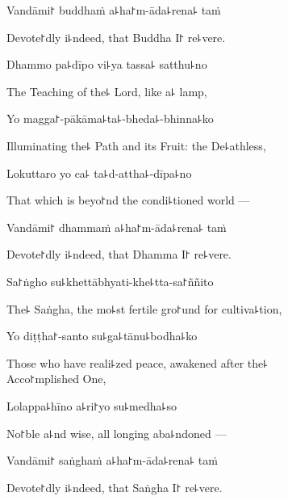 Vandāmi꜓ buddhaṁ a꜕ha꜓m-āda꜕rena꜕ taṁ

\begin{english}
  Devote꜓dly i꜕ndeed, that Buddha I꜓ re꜕vere.
\end{english}

Dhammo pa꜕dīpo vi꜕ya tassa꜕ satthu꜕no

\begin{english}
  The Teaching of the꜕ Lord, like a꜕ lamp,
\end{english}

Yo magga꜓-pākāma꜕ta꜕-bheda꜕-bhinna꜕ko

\begin{english}
  Illuminating the꜕ Path and its Fruit: the De꜕athless,
\end{english}

Lokuttaro yo ca꜕ ta꜕d-attha꜕-dīpa꜕no

\begin{english}
  That which is beyo꜓nd the condi꜕tioned world ---
\end{english}

Vandāmi꜓ dhammaṁ a꜕ha꜓m-āda꜕rena꜕ taṁ

\begin{english}
  Devote꜓dly i꜕ndeed, that Dhamma I꜓ re꜕vere.
\end{english}

\clearpage

Sa꜓ṅgho su꜕khettābhyati-khe꜕tta-sa꜓ññito

\begin{english}
  The꜕ Saṅgha, the mo꜕st fertile gro꜓und for cultiva꜕tion,
\end{english}

Yo diṭṭha꜓-santo su꜕ga꜕tānu꜕bodha꜕ko

\begin{english}
  Those who have reali꜕zed peace, awakened after the꜕ \\Acco꜓mplished One,
\end{english}

Lolappa꜕hīno a꜕ri꜓yo su꜕medha꜕so

\begin{english}
  No꜓ble a꜕nd wise, all longing aba꜕ndoned ---
\end{english}

Vandāmi꜓ saṅghaṁ a꜕ha꜓m-āda꜕rena꜕ taṁ

\begin{english}
  Devote꜓dly i꜕ndeed, that Saṅgha I꜓ re꜕vere.
\end{english}


